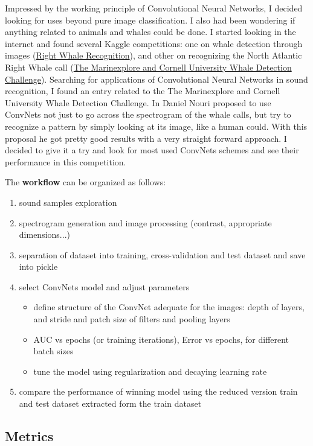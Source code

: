 \documentclass[]{article}
\newcommand{\competition}{The Marinexplore and Cornell University Whale Detection Challenge}
\begin{document}
Impressed by the working principle of Convolutional Neural Networks, I decided looking for uses beyond pure image classification. I also had been wondering if anything related to animals and whales could be done. I started looking in the internet and found several Kaggle competitions: one on whale detection through images (\href{https://www.kaggle.com/c/noaa-right-whale-recognition}{Right Whale Recognition}), and other on recognizing the North Atlantic Right Whale call (\href{https://www.kaggle.com/c/whale-detection-challenge}{\competition}). Searching for applications of Convolutional Neural Networks in sound recognition, I found an entry related to the \competition. In \cite{Nouriblog} Daniel Nouri proposed to use ConvNets not just to go across the spectrogram of the whale calls, but try to recognize a pattern by simply looking at its image, like a human could. With this proposal he got pretty good results with a very straight forward approach. I decided to give it a try and look for most used ConvNets schemes and see their performance in this competition.

The \textbf{workflow} can be organized as follows:
\begin{enumerate}
	\item sound samples exploration
	\item spectrogram generation and image processing (contrast, appropriate dimensions...)
	\item separation of dataset into training, cross-validation and test dataset and save into pickle 
	\item select ConvNets model and adjust parameters
	\begin{itemize}
		\item define structure of the ConvNet adequate for the images: depth of layers, and stride and patch size of filters and pooling layers
		\item AUC vs epochs (or training iterations), Error vs epochs, for different batch sizes
		\item tune the model using regularization and decaying learning rate		
	\end{itemize}
	\item compare the performance of winning model using the reduced version train and test dataset extracted form the train dataset
\end{enumerate}

\subsection{Metrics}\label{metrics}

\end{document}
